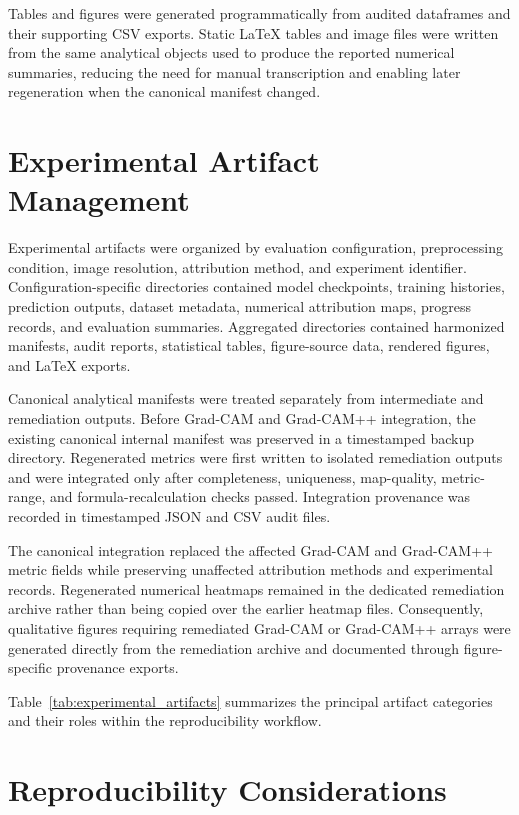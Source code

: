 Tables and figures were generated programmatically from audited dataframes and their supporting CSV exports. Static LaTeX tables and image files were written from the same analytical objects used to produce the reported numerical summaries, reducing the need for manual transcription and enabling later regeneration when the canonical manifest changed.


\section{Experimental Artifact Management}
\label{sec:experimental_artifacts_management}
Experimental artifacts were organized by evaluation configuration, preprocessing condition, image resolution, attribution method, and experiment identifier. Configuration-specific directories contained model checkpoints, training histories, prediction outputs, dataset metadata, numerical attribution maps, progress records, and evaluation summaries. Aggregated directories contained harmonized manifests, audit reports, statistical tables, figure-source data, rendered figures, and LaTeX exports.

Canonical analytical manifests were treated separately from intermediate and remediation outputs. Before Grad-CAM and Grad-CAM++ integration, the existing canonical internal manifest was preserved in a timestamped backup directory. Regenerated metrics were first written to isolated remediation outputs and were integrated only after completeness, uniqueness, map-quality, metric-range, and formula-recalculation checks passed. Integration provenance was recorded in timestamped JSON and CSV audit files.

The canonical integration replaced the affected Grad-CAM and Grad-CAM++ metric fields while preserving unaffected attribution methods and experimental records. Regenerated numerical heatmaps remained in the dedicated remediation archive rather than being copied over the earlier heatmap files. Consequently, qualitative figures requiring remediated Grad-CAM or Grad-CAM++ arrays were generated directly from the remediation archive and documented through figure-specific provenance exports.

Table~\ref{tab:experimental_artifacts} summarizes the principal artifact categories and their roles within the reproducibility workflow.




\section{Reproducibility Considerations}

